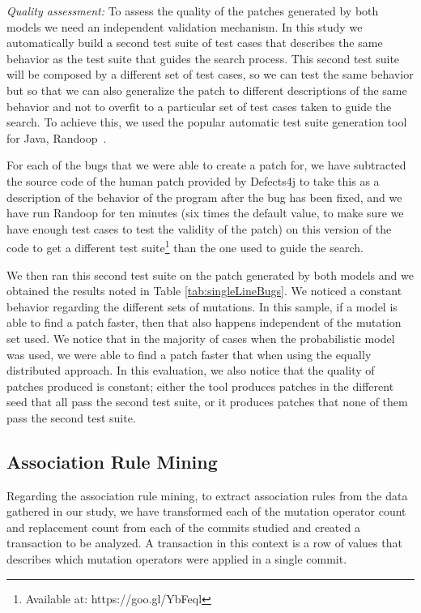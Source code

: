 \documentclass[conference]{IEEEtran}
\begin{document}
\emph{Quality assessment:}
To assess the quality of the patches generated by both models we need an
independent validation mechanism. In this study we automatically build a second
test suite of test cases that describes the same behavior as the test suite that
guides the search process. This second test suite will be composed by a
different set of test cases, so we can test the same behavior but so that we can
also generalize the patch to different descriptions of the same behavior and not
to overfit to a particular set of test cases taken to guide the search. To
achieve this, we used the popular automatic test suite generation tool for Java,
Randoop~\cite{pacheco07}. 

For each of the bugs that we were able to create a patch for, we have subtracted
the source code of the human patch provided by Defects4j to take this as a
description of the behavior of the program after the bug has been fixed, and we
have run Randoop for ten minutes (six times the default value, to make sure we
have enough test cases to test the validity of the patch) on this version of the
code to get a different test suite\footnote{Available at: https://goo.gl/YbFeql}
than the one used to guide the search.  

We then ran this second test suite on the patch generated by both models and we
obtained the results noted in Table \ref{tab:singleLineBugs}. We noticed a
constant behavior regarding the different sets of mutations. In this sample, if
a model is able to find a patch faster, then that also happens independent of
the mutation set used. We notice that in the majority of cases when the
probabilistic model was used, we were able to find a patch faster that when
using the equally distributed approach. In this evaluation, we also notice that
the quality of patches produced is constant; either the tool produces patches in
the different seed that all pass the second test suite, or it produces patches
that none of them pass the second test suite.  


\subsection{Association Rule Mining} \label{armRes}
Regarding the association rule mining, to extract association rules from the data gathered in our study, we 
have transformed each of the mutation operator count and replacement count from 
each of the commits studied and created a transaction to be analyzed. A transaction in this context is a row of values that describes which mutation operators were applied in a single commit.
\end{document}
